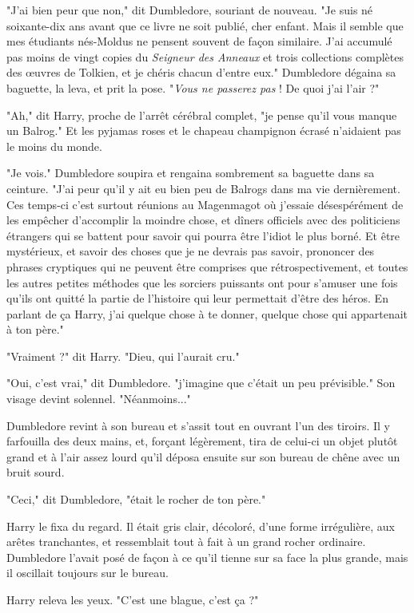 "J'ai bien peur que non," dit Dumbledore, souriant de nouveau. "Je suis né soixante-dix ans avant que ce livre ne soit publié, cher enfant. Mais il semble que mes étudiants nés-Moldus ne pensent souvent de façon similaire. J'ai accumulé pas moins de vingt copies du \emph{Seigneur des Anneaux } et trois collections complètes des œuvres de Tolkien, et je chéris chacun d'entre eux." Dumbledore dégaina sa baguette, la leva, et prit la pose. "\emph{Vous ne passerez pas}  ! De quoi j'ai l'air ?"

"Ah," dit Harry, proche de l'arrêt cérébral complet, "je pense qu'il vous manque un Balrog." Et les pyjamas roses et le chapeau champignon écrasé n'aidaient pas le moins du monde.

"Je vois." Dumbledore soupira et rengaina sombrement sa baguette dans sa ceinture. "J'ai peur qu'il y ait eu bien peu de Balrogs dans ma vie dernièrement. Ces temps-ci c'est surtout réunions au Magenmagot où j'essaie désespérément de les empêcher d'accomplir la moindre chose, et dîners officiels avec des politiciens étrangers qui se battent pour savoir qui pourra être l'idiot le plus borné. Et être mystérieux, et savoir des choses que je ne devrais pas savoir, prononcer des phrases cryptiques qui ne peuvent être comprises que rétrospectivement, et toutes les autres petites méthodes que les sorciers puissants ont pour s'amuser une fois qu'ils ont quitté la partie de l'histoire qui leur permettait d'être des héros. En parlant de ça Harry, j'ai quelque chose à te donner, quelque chose qui appartenait à ton père."

"Vraiment ?" dit Harry. "Dieu, qui l'aurait cru."

"Oui, c'est vrai," dit Dumbledore. "j'imagine que c'était un peu prévisible." Son visage devint solennel. "Néanmoins..."

Dumbledore revint à son bureau et s'assit tout en ouvrant l'un des tiroirs. Il y farfouilla des deux mains, et, forçant légèrement, tira de celui-ci un objet plutôt grand et à l'air assez lourd qu'il déposa ensuite sur son bureau de chêne avec un bruit sourd.

"Ceci," dit Dumbledore, "était le rocher de ton père."

Harry le fixa du regard. Il était gris clair, décoloré, d'une forme irrégulière, aux arêtes tranchantes, et ressemblait tout à fait à un grand rocher ordinaire. Dumbledore l'avait posé de façon à ce qu'il tienne sur sa face la plus grande, mais il oscillait toujours sur le bureau.

Harry releva les yeux. "C'est une blague, c'est ça ?"

